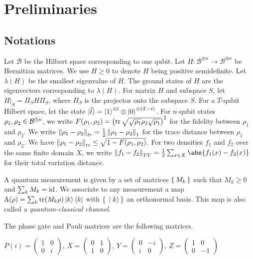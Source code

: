 \section{Preliminaries}


\subsection{Notations}

Let $\mathcal{B}$ be the Hilbert space corresponding to one qubit. Let $H:\mathcal{B}^{\otimes n}\rightarrow\mathcal{B}^{\otimes n}$ be Hermitian matrices. We use $H\geq0$ to denote $H$ being positive semidefinite. Let $\lambda(H)$ be the smallest eigenvalue of $H$. The ground states of $H$ are the eigenvectors corresponding to $\lambda(H)$. For matrix $H$ and subspace $S$, let $H\big|_S=\Pi_S H \Pi_S$, where $\Pi_S$ is the projector onto the subspace $S$. For a $T$-qubit Hilbert space, let the state $\ket{\widehat{t}}=\ket{1}^{\otimes t}\otimes \ket{0}^{{\otimes (T-t)}}$.
For $n$-qubit states $\rho_1, \rho_2\in\mathcal{B}^{\otimes n}$,
we write $F(\rho_1, \rho_2)=\left(\operatorname{tr}\sqrt{\sqrt{\rho_1}\rho_2\sqrt{\rho_1}}\right)^2$ for the fidelity between $\rho_1$ and $\rho_2$.
We write $\left\lVert\rho_1-\rho_2\right\rVert_{tr}=\frac{1}{2}\left\lVert\rho_1-\rho_2\right\rVert_1$ for the trace distance between $\rho_1$ and $\rho_2$.
We have $\left\lVert\rho_1-\rho_2\right\rVert_{tr}\leq\sqrt{1-F(\rho_1, \rho_2)}$.
For two densities $f_1$ and $f_2$ over the same finite domain $X$, we write $\norm{f_1-f_2}_{TV}=\frac{1}{2}\sum_{x\in X}\abs{f_1(x)-f_2(x)}$ for their total variation distance.

\begin{definition} 
	\label{def:QCChannel}
	A quantum measurement is given by a set of matrices $\set{M_k}$ such that $M_k\geq0$ and $\sum_k M_k=\operatorname{id}$.
	We associate to any measurement a map $\Lambda(\rho)=\sum_k \operatorname{tr}(M_k\rho)\ket{k}\bra{k}$
	with $\set{\ket{k}}$ an orthonormal basis.
	This map is also called a \emph{quantum-classical channel}.
\end{definition}

The phase gate and Pauli matrices are the following matrices.

\begin{definition}
	$P(i)=\begin{pmatrix}1&0\\0&i\end{pmatrix}$,
	$X=\begin{pmatrix}0&1\\1&0\end{pmatrix}$,
	$Y=\begin{pmatrix}0&-i\\i&0\end{pmatrix}$,
	$Z=\begin{pmatrix}1&0\\0&-1\end{pmatrix}$
\end{definition}

